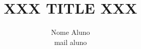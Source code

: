 \documentclass{llncs}
\begin{document}
\mainmatter              %
\title{XXX TITLE XXX}
\author{
	Nome Aluno\\
	mail aluno \\
}


{\def\addcontentsline#1#2#3{}\maketitle} %

\begin{abstract}

\end{abstract}

\setcounter{tocdepth}{2} 
\tableofcontents

\vfill
\pagebreak










\end{document}
